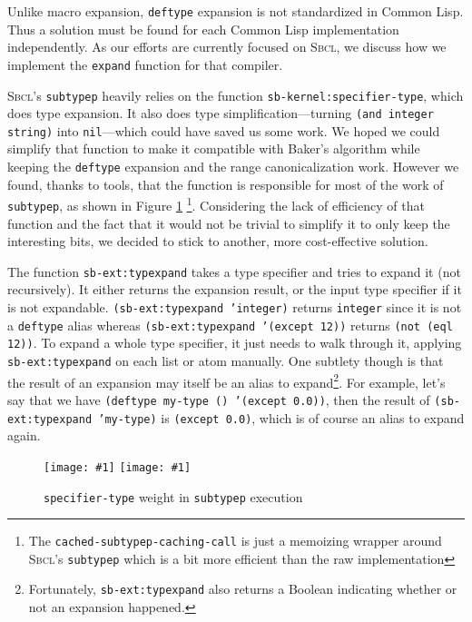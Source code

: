 \documentclass[format=sigconf]{acmart}
\newcommand\code[2][\small]{\sloppy\texttt{#1#2}}
\newcommand\footcode[1]{\code[\scriptsize]{#1}}
\theoremstyle{definition}
\newcommand\sbcl{\textsc{Sbcl}}
\begin{document}
Unlike macro expansion, \code{deftype} expansion is not standardized in Common
Lisp. Thus a solution must be found for each Common Lisp implementation
independently. As our efforts are currently focused on \sbcl{}, we discuss
how we implement the \code{expand} function for that compiler.

\sbcl's \code{subtypep} heavily relies on the function
\code{sb-kernel:specifier-type}, which does type expansion. It also does
type simplification---turning \code{(and integer string)} into
\code{nil}---which could have saved us some work. We hoped we could simplify
that function to make it compatible with Baker's algorithm while keeping the
\code{deftype} expansion and the range canonicalization work. However we found,
thanks to \cite{newton.18.phd} tools, that the function is responsible for most
of the work of \code{subtypep}, as shown in Figure \ref{fig:specifiertype}
\footnote{The \footcode{cached-subtypep-caching-call} is just a memoizing wrapper
  around \sbcl's \footcode{subtypep} which is a bit more efficient than the raw
  implementation}.
Considering the lack of efficiency of that function and the fact that it would
not be trivial to simplify it to only keep the interesting bits, we decided to
stick to another, more cost-effective solution.

The function \code{sb-ext:typexpand} takes a type specifier and tries to expand
it (not recursively). It either returns the expansion result, or the input type
specifier if it is not expandable. \code{(sb-ext:typexpand 'integer)} returns
\code{integer} since it is not a \code{deftype} alias whereas
\code{(sb-ext:typexpand '(except 12))} returns \code{(not (eql 12))}.
To expand a whole type specifier, it just needs to walk through it, applying
\code{sb-ext:typexpand} on each list or atom manually. One subtlety though is
that the result of an expansion may itself be an alias to
expand\footnote{%
  Fortunately, \footcode{sb-ext:typexpand} also returns a Boolean indicating
  whether or not an expansion happened.%
}. For example, let's say that we have
\code{(deftype my-type () '(except 0.0))}, then the result of
\code{(sb-ext:typexpand 'my-type)} is \code{(except 0.0)}, which is of course an
alias to expand again.

\begin{figure}
  \centering
  \newcommand\profgraph[1]{\texttt{[image: \#1]}}
  \profgraph{assets/19/stGTstp}
  \profgraph{assets/19/stEQstp}
  \caption{\code{specifier-type} weight in \code{subtypep} execution}
  \label{fig:specifiertype}
\end{figure}
\end{document}
